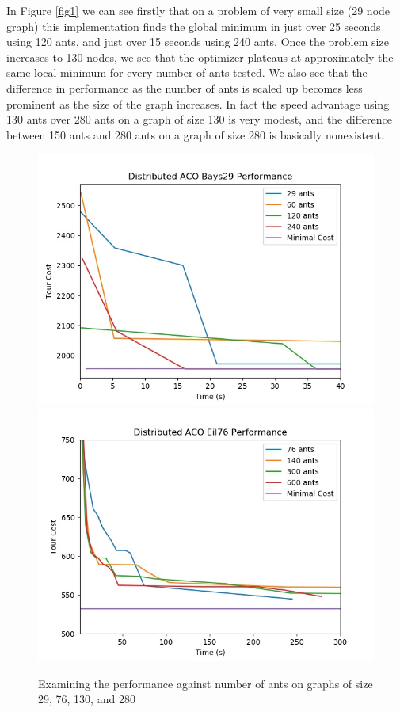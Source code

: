 \documentclass[12pt]{article}
\begin{document}
In Figure \ref{fig1} we can see firstly that 
on a problem of very small size (29 node graph) this implementation 
finds the global minimum in just over 25 seconds using 120 ants,
and just over 15 seconds using 240 ants. Once the problem size increases to 
130 nodes, we see that the optimizer plateaus at approximately the 
same local minimum for 
every number of ants tested. We also see that the difference in performance 
as the number of ants is scaled up becomes less prominent as the size of 
the graph increases. In fact the speed advantage using 130 ants over 280
ants on a graph of size 130 is very modest, and the difference between 150
ants and 280 ants on a graph of size 280 is basically nonexistent.   \\

\begin{figure}
    \caption{Examining the performance against number of ants on graphs of size 29, 76, 130, and 280}
    \includegraphics[scale=0.5]{bays29_performance_vs_ants.jpg}
    \includegraphics[scale=0.5]{eil76_performance_vs_ants.jpg}

\end{figure}
\end{document}
